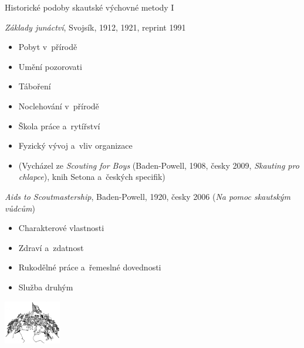 \documentclass[compress, xelatex, 11pt, xcolor=dvipsnames, print, aspectratio=169,
	hyperref={
		bookmarks=true,
		unicode=true,
		colorlinks=true,
		pdftitle={Skautska vychovna metoda},
		plainpages=false,
		pdfauthor={Vojtech Zeisek},
		pdfsubject={Skautska vychovna metoda a jeji vyvoj za posledni stoleti a desetileti},
		pdfcreator={XeLaTeX},
		pdfkeywords={Junak, Pedagogika, Skaut, Skauting, Vychovna metoda},
		linkcolor=Red, %
		anchorcolor=ForestGreen, %
		citecolor=ForestGreen, %
		filecolor=ForestGreen, %
		menucolor=ForestGreen, %
		urlcolor=Sepia, %
		pdftex},
	url={hyphens, lowtilde} %
	]{beamer}
\begin{document}
\begin{frame}{Historické podoby skautské výchovné metody I}
	\begin{multicols}{2}
		\textit{Základy junáctví}, Svojsík, 1912, 1921, reprint 1991
		\begin{itemize}
			\item Pobyt v~přírodě
			\item Umění pozorovati
			\item Táboření
			\item Noclehování v~přírodě
			\item Škola práce a~rytířství
			\item Fyzický vývoj a~vliv organizace
			\item (Vycházel ze \textit{Scouting for Boys} (Baden-Powell, 1908, česky 2009, \textit{Skauting pro chlapce}), knih Setona a~českých specifik)
		\end{itemize}
		\columnbreak
		\textit{Aids to Scoutmastership}, Baden-Powell, 1920, česky 2006 (\textit{Na pomoc skautským vůdcům})
		\begin{itemize}
			\item Charakterové vlastnosti
			\item Zdraví a~zdatnost
			\item Rukodělné práce a~řemeslné dovednosti
			\item Služba druhým
		\end{itemize}
		\begin{center}
			\includegraphics[width=2.5cm]{sireni.png}
		\end{center}
	\end{multicols}
\end{frame}
\end{document}
